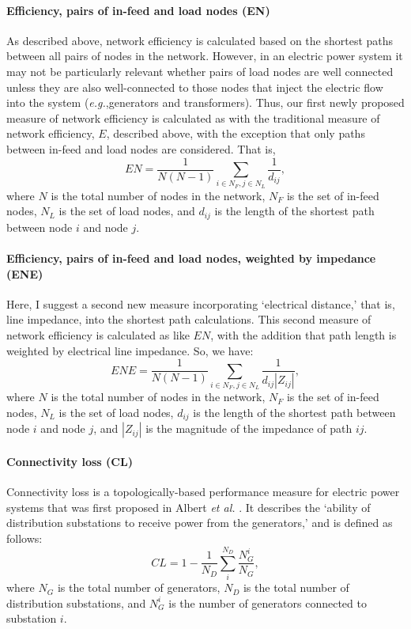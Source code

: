 \paragraph{\normalfont\textbf{Efficiency, pairs of in-feed and load nodes (EN)}}
As described above, network efficiency is calculated based on the shortest paths between all pairs of nodes in the network. However, in an electric power system it may not be particularly relevant whether pairs of load nodes are well connected unless they are also well-connected to those nodes that inject the electric flow into the system (\emph{e.g.},generators and transformers). Thus, our first newly proposed measure of network efficiency is calculated as with the traditional measure of network efficiency, $E$, described above, with the exception that only paths between in-feed and load nodes are considered.  That is,  
\begin{equation}
 EN = \frac{1}{N(N-1)}\sum_{i \in N_{F},j \in N_{L}}\frac{1}{d_{ij}},
\end{equation}
 where $N$ is the total number of nodes in the network, $N_F$ is the set of in-feed nodes, $N_L$ is the set of load nodes, and $d_{ij}$ is the length of the shortest path between node $i$ and node $j$.
 
\paragraph{\normalfont\textbf{Efficiency, pairs of in-feed and load nodes, weighted by impedance (ENE)}}
Here, I suggest a second new measure incorporating `electrical distance,' that is, line impedance, into the shortest path calculations. This second measure of network efficiency is calculated as like $EN$, with the addition that path length is weighted by electrical line impedance.  So, we have:
\begin{equation}
 ENE = \frac{1}{N(N-1)}\sum_{i \in N_{F},j \in N_{L}}\frac{1}{d_{ij}|Z_{ij}|},
\end{equation}
where $N$ is the total number of nodes in the network, $N_F$ is the set of in-feed nodes, $N_L$ is the set of load nodes, $d_{ij}$ is the length of the shortest path between node $i$ and node $j$, and $|Z_{ij}|$ is the magnitude of the impedance of path $ij$.
 
\paragraph{\normalfont\textbf{Connectivity loss (CL)}}
Connectivity loss is a topologically-based performance measure for electric power systems that was first proposed in Albert \emph{et al.} \cite{Albert2004}.  It describes the `ability of distribution substations to receive power from the generators,' and is defined as follows:
\begin{equation}
 CL = 1 - \frac{1}{N_D}\sum_{i}^{N_D}\frac{N_{G}^i}{N_G},
\end{equation}
where $N_G$ is the total number of generators, $N_D$ is the total number of distribution substations, and $N_G^i$ is the number of generators connected to substation $i$.
 
